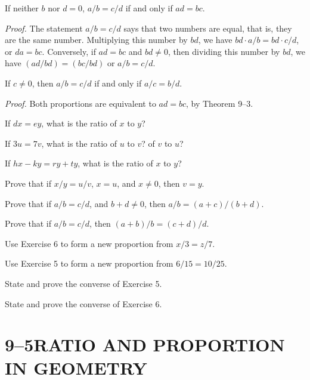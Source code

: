 \documentclass[11pt]{book}
\theoremstyle{bkplain}
\theoremstyle{XIplainnote}
\theoremstyle{bkplain}
\theoremstyle{bkplain}
\begin{document}
\begin{theorem}
If neither $b$ nor $d = 0$, $a/b = c/d$ if and only if $ad = bc$.
\end{theorem}

\noindent\emph{Proof.} The statement $a/b = c/d$ says that two numbers are equal,
that is, they are the same number. Multiplying this number by $bd$, we have
$bd \cdot a/b = bd \cdot c/d$, or $da = bc$. Conversely, if $ad = bc$ and
$bd \neq 0$, then dividing this number by $bd$, we have $(ad/bd) = (bc/bd)$ or
$a/b = c/d$.

\begin{theorem}
If $c \neq 0$, then $a/b = c/d$ if and only if $a/c = b/d$.
\end{theorem}

\noindent\emph{Proof.} Both proportions are equivalent to $ad = bc$, by
Theorem 9--3.

\begin{exercisecols}
\begin{exlist}
\item If $dx = ey$, what is the ratio of $x$ to $y$?
\item If $3u = 7v$, what is the ratio of $u$ to $v$? of $v$ to $u$?
\item If $hx - ky = ry + ty$, what is the ratio of $x$ to $y$?
\item[\stex 4.] Prove that if $x/y = u/v$, $x = u$, and $x \neq 0$, then $v = y$.
\item[\stex 5.] Prove that if $a/b = c/d$, and $b + d \neq 0$, then
      $a/b = (a+c)/(b+d)$.
\item[\stex 6.] Prove that if $a/b = c/d$, then $(a+b)/b = (c+d)/d$.
\item[7.] Use Exercise 6 to form a new proportion from $x/3 = z/7$.
\item[8.] Use Exercise 5 to form a new proportion from $6/15 = 10/25$.
\item[\stex 9.] State and prove the converse of Exercise 5.
\item[\stex 10.] State and prove the converse of Exercise 6.
\end{exlist}
\end{exercisecols}

\section*{9--5\quad RATIO AND PROPORTION IN GEOMETRY}
\end{document}
